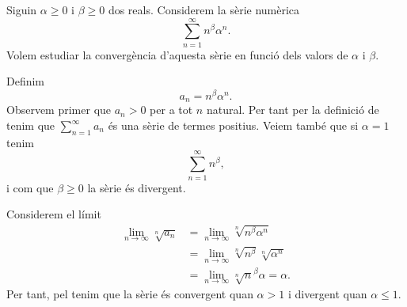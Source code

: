 \documentclass[../Apunts.tex]{subfiles}
\begin{document}
	\begin{example}
		Siguin \(\alpha\geq0\) i \(\beta\geq0\) dos reals. Considerem la sèrie numèrica
		\[\sum_{n=1}^{\infty}n^{\beta}\alpha^{n}.\]
		Volem estudiar la convergència d'aquesta sèrie en funció dels valors de \(\alpha\) i \(\beta\).
		\begin{solution}
			Definim
			\[a_{n}=n^{\beta}\alpha^{n}.\]
			Observem primer que \(a_{n}>0\) per a tot \(n\) natural. Per tant per la definició de  tenim que \(\sum_{n=1}^{\infty}a_{n}\) és una sèrie de termes positius. Veiem també que si \(\alpha=1\) tenim
			\[\sum_{n=1}^{\infty}n^{\beta},\]
			i com que \(\beta\geq0\) la sèrie és divergent.
			
			Considerem el límit
			\begin{align*}
			\lim_{n\to\infty}\sqrt[n]{a_{n}}&=\lim_{n\to\infty}\sqrt[n]{n^{\beta}\alpha^{n}}\\
			&=\lim_{n\to\infty}\sqrt[n]{n^{\beta}}\sqrt[n]{\alpha^{n}}\\
			&=\lim_{n\to\infty}\sqrt[n]{n}^{\beta}\alpha=\alpha.
			\end{align*}
			Per tant, pel  tenim que la sèrie és convergent quan \(\alpha>1\) i divergent quan \(\alpha\leq1\). 
		\end{solution}
	\end{example}
\end{document}
